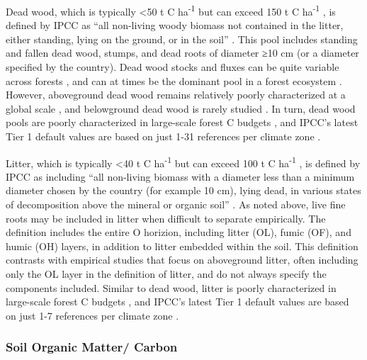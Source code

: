 \documentclass[, manuscript]{copernicus}
\begin{document}
Dead wood, which is typically \textless50 t C ha\textsuperscript{-1} but
can exceed 150 t C ha\textsuperscript{-1}
\citep{anderson-teixeira_carbon_2021}, is defined by IPCC as ``all
non-living woody biomass not contained in the litter, either standing,
lying on the ground, or in the soil''
\citep{ipcc_good_2003, ipcc_2006_2006}. This pool includes standing and
fallen dead wood, stumps, and dead roots of diameter ≥10 cm (or a
diameter specified by the country). Dead wood stocks and fluxes can be
quite variable across forests \citep{anderson-teixeira_carbon_2021}, and
can at times be the dominant pool in a forest ecosystem \citep[e.g.,
following a severe natural disturbance,][]{carmona_coarse_2002}.
However, aboveground dead wood remains relatively poorly characterized
at a global scale \citep{anderson-teixeira_carbon_2021}, and belowground
dead wood is rarely studied \citep{merganicova_dadwood_2012}. In turn,
dead wood pools are poorly characterized in large-scale forest C budgets
\citep{pan_large_2011, harris_global_2021}, and IPCC's latest Tier 1
default values are based on just 1-31 references per climate zone
\citep[Table 2.2 in][]{ipcc_2019_2019}.

Litter, which is typically \textless40 t C ha\textsuperscript{-1} but
can exceed 100 t C ha\textsuperscript{-1}
\citep{anderson-teixeira_carbon_2021}, is defined by IPCC as including
``all non-living biomass with a diameter less than a minimum diameter
chosen by the country (for example 10 cm), lying dead, in various states
of decomposition above the mineral or organic soil''
\citep{ipcc_good_2003, ipcc_2006_2006}. As noted above, live fine roots
may be included in litter when difficult to separate empirically. The
definition includes the entire O horizion, including litter (OL), fumic
(OF), and humic (OH) layers, in addition to litter embedded within the
soil. This definition contrasts with empirical studies that focus on
aboveground litter, often including only the OL layer in the definition
of litter, and do not always specify the components included. Similar to
dead wood, litter is poorly characterized in large-scale forest C
budgets \citep{pan_large_2011, harris_global_2021}, and IPCC's latest
Tier 1 default values are based on just 1-7 references per climate zone
\citep[Table 2.2 in][]{ipcc_2019_2019}.

\subsubsection{Soil Organic Matter/ Carbon}
\end{document}
